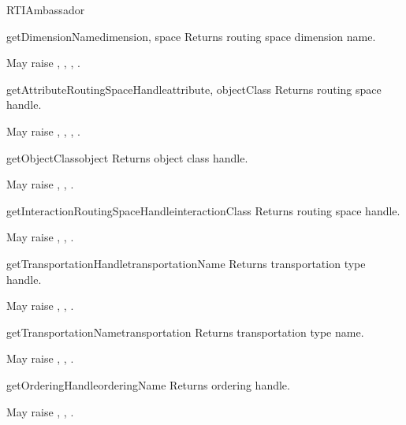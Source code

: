\begin{classdesc}{RTIAmbassador}{}
\begin{methoddesc}{getDimensionName}{dimension, space}
Returns routing space dimension name.

May raise
,
,
,
.
\end{methoddesc}

\begin{methoddesc}{getAttributeRoutingSpaceHandle}{attribute, objectClass}
Returns routing space handle.

May raise
,
,
,
.
\end{methoddesc}

\begin{methoddesc}{getObjectClass}{object}
Returns object class handle.

May raise
,
,
.
\end{methoddesc}

\begin{methoddesc}{getInteractionRoutingSpaceHandle}{interactionClass}
Returns routing space handle.

May raise
,
,
.
\end{methoddesc}

\begin{methoddesc}{getTransportationHandle}{transportationName}
Returns transportation type handle.

May raise
,
,
.
\end{methoddesc}

\begin{methoddesc}{getTransportationName}{transportation}
Returns transportation type name.

May raise
,
,
.
\end{methoddesc}

\begin{methoddesc}{getOrderingHandle}{orderingName}
Returns ordering handle.

May raise
,
,
.
\end{methoddesc}


\end{classdesc}
